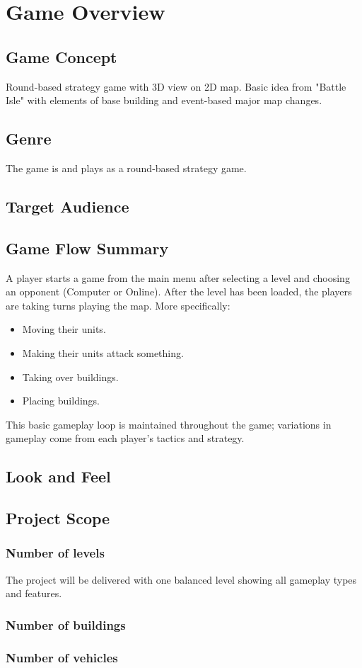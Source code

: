 \chapter{Game Overview}
\section{Game Concept}
Round-based strategy game with 3D view on 2D map. Basic idea from "Battle Isle" with elements of base building and
event-based major map changes.
\section{Genre}
The game is and plays as a round-based strategy game.
\section{Target Audience} %
\section{Game Flow Summary}
A player starts a game from the main menu after selecting a level and choosing an opponent (Computer or Online).
After the level has been loaded, the players are taking turns playing the map. More specifically:
\begin{itemize}
    \item Moving their units.
    \item Making their units attack something.
    \item Taking over buildings.
    \item Placing buildings.
\end{itemize}
This basic gameplay loop is maintained throughout the game; variations in
gameplay come from each player's tactics and strategy.
\section{Look and Feel} %

\section{Project Scope}
\subsection{Number of levels}
The project will be delivered with one balanced level showing all gameplay types and features.
\subsection{Number of buildings} %
\subsection{Number of vehicles} %
